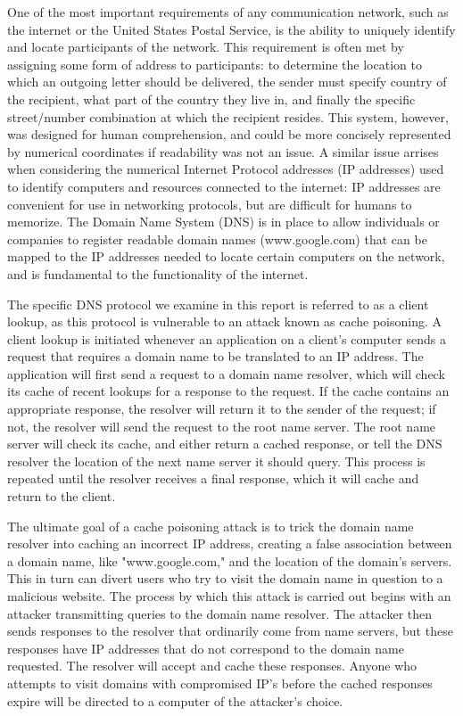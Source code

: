 \documentclass[a4paper, 12pt]{article} %
\begin{document}
One of the most important requirements of any communication network, such as the internet or the United States Postal Service, is the ability to uniquely identify and locate participants of the network. This requirement is often met by assigning some form of address to participants: to determine the location to which an outgoing letter should be delivered, the sender must specify country of the recipient, what part of the country they live in, and finally the specific street/number combination at which the recipient resides. This system, however, was designed for human comprehension, and could be more concisely represented by numerical coordinates if readability was not an issue. A similar issue arrises when considering the numerical Internet Protocol addresses (IP addresses) used to identify computers and resources connected to the internet: IP addresses are convenient for use in networking protocols, but are difficult for humans to memorize. The Domain Name System (DNS) is in place to allow individuals or companies to register readable domain names (www.google.com) that can be mapped to the IP addresses\cite{Schuba} needed to locate certain computers on the network, and is fundamental to the functionality of the internet.

The specific DNS protocol we examine in this report is referred to as a client lookup, as this protocol is vulnerable to an attack known as cache poisoning\cite{Son}. A client lookup is initiated whenever an application on a client's computer sends a request that requires a domain name to be translated to an IP address. The application will first send a request to a domain name resolver, which will check its cache of recent lookups for a response to the request. If the cache contains an appropriate response, the resolver will return it to the sender of the request; if not, the resolver will send the request to the root name server. The root name server will check its cache, and either return a cached response, or tell the DNS resolver the location of the next name server it should query\cite{Son}. This process is repeated until the resolver receives a final response, which it will cache and return to the client\cite{Racki}.

The ultimate goal of a cache poisoning attack is to trick the domain name resolver into caching an incorrect IP address, creating a false association between a domain name, like "www.google.com," and the location of the domain's servers\cite{Schuba}. This in turn can divert users who try to visit the domain name in question to a malicious website. The process by which this attack is carried out begins with an attacker transmitting queries to the domain name resolver. The attacker then sends responses to the resolver that ordinarily come from name servers, but these responses have IP addresses that do not correspond to the domain name requested. The resolver will accept and cache these responses. Anyone who attempts to visit domains with compromised IP's before the cached responses expire will be directed to a computer of the attacker's choice. 
\end{document}
